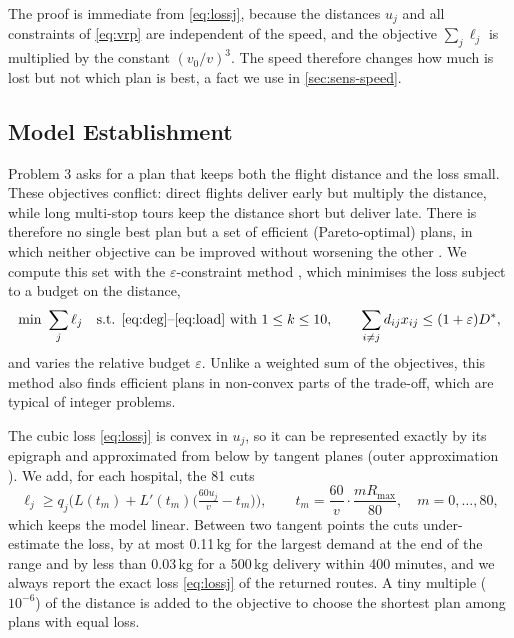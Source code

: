 \documentclass[11pt,a4paper]{article}
\theoremstyle{definition}
\begin{document}
The proof is immediate from \eqref{eq:lossj}, because the distances $u_j$ and all constraints of \eqref{eq:vrp} are independent of the speed, and the objective $\sum_j\ell_j$ is multiplied by the constant $(v_0/v)^3$.
The speed therefore changes how much is lost but not which plan is best, a fact we use in \cref{sec:sens-speed}.

\subsection{Model Establishment}
Problem 3 asks for a plan that keeps both the flight distance and the loss small.
These objectives conflict: direct flights deliver early but multiply the distance, while long multi-stop tours keep the distance short but deliver late.
There is therefore no single best plan but a set of efficient (Pareto-optimal) plans, in which neither objective can be improved without worsening the other \citep{miettinen1999}.
We compute this set with the $\varepsilon$-constraint method \citep{haimes1971}, which minimises the loss subject to a budget on the distance,
\begin{equation}\label{eq:eps}
\min\ \sum_{j}\ell_j \quad\text{s.t. \eqref{eq:deg}--\eqref{eq:load} with } 1\le k\le 10,\qquad \sum_{i\neq j} d_{ij}x_{ij}\le(1+\varepsilon)D^*,
\end{equation}
and varies the relative budget $\varepsilon$.
Unlike a weighted sum of the objectives, this method also finds efficient plans in non-convex parts of the trade-off, which are typical of integer problems.

The cubic loss \eqref{eq:lossj} is convex in $u_j$, so it can be represented exactly by its epigraph and approximated from below by tangent planes (outer approximation \citep{duran1986}).
We add, for each hospital, the 81 cuts
\begin{equation}\label{eq:tangent}
\ell_j \ge q_j\Big(L(t_m)+L'(t_m)\big(\tfrac{60u_j}{v} - t_m\big)\Big), \qquad t_m=\frac{60}{v}\cdot\frac{m R_{\max}}{80},\quad m=0,\dots,80,
\end{equation}
which keeps the model linear.
Between two tangent points the cuts under-estimate the loss, by at most 0.11\,kg for the largest demand at the end of the range and by less than 0.03\,kg for a 500\,kg delivery within 400 minutes, and we always report the exact loss \eqref{eq:lossj} of the returned routes.
A tiny multiple ($10^{-6}$) of the distance is added to the objective to choose the shortest plan among plans with equal loss.
\end{document}
